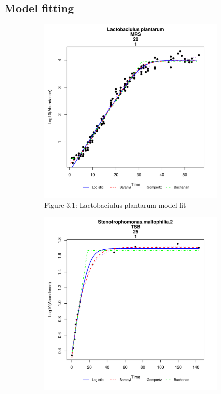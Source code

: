 \subsection{Model fitting}
\begin{figure}[h!]
    \centering
    \begin{subfigure}[h]{0.4\textwidth}
        \includegraphics[width=\textwidth]{../Results/Lplantarum_fit.pdf}
        \caption{Figure 3.1: Lactobaciulus plantarum model fit}
        \label{fig:Lactobaciulus plantarum}
    \end{subfigure}
    \hfill
    \begin{subfigure}[h]{0.4\textwidth}
        \includegraphics[width=\textwidth]{../Results/Smaltophilia25_fit.pdf}

\end{subfigure}
\end{figure}
